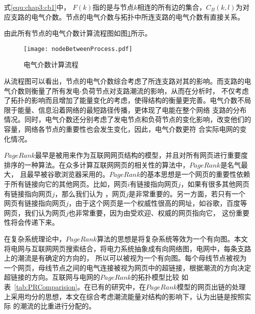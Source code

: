 式\ref{equ:chap3:cb1}中，
$F(k)$指的是与节点$k$相连的所有边的集合，$C_B (k,l)$为对应支路的电气介数。节点的电气介数与拓扑中所连支路的电气介数有直接关系。

由此所有节点的电气介数计算流程图如图\ref{fig:nodeBetweenPro}所示。 
\begin{figure}[H] 
  \centering
  \texttt{[image: nodeBetweenProcess.pdf]}
  \caption{电气介数计算流程}
  \label{fig:nodeBetweenPro}
\end{figure}

从流程图可以看出，节点的电气介数综合考虑了所连支路对其的影响。而支路的电气介数则衡量了所有发电-负荷节点对支路潮流的影响，从而在分析时，
不仅考虑了拓扑的影响而且增加了能量变化的考虑，使得结构的衡量更完善。电气介数不局限于能量、信息沿着网络的最短路径传播，更体现了电能在整个网络
支路的分布情况。同时，电气介数还分别考虑了发电节点和负荷节点的变化影响，改变他们的容量，网络各节点的重要性也会发生变化，因此，电气介数更符
合实际电网的变化情况。




$PageRank$最早是被用来作为互联网网页结构的模型，并且对所有网页进行重要度排序的一种算法\cite{refs68,refs69}。在众多计算互联网网页的相关性的算法中，$PageRank$是名气最大，
且最早被谷歌浏览器采用的。$PageRank$的基本思想是一个网页的重要性依赖于所有链接向它的其他网页。比如，网页$i$有链接指向网页$j$，如果有很多其他网页有链接指向网页$j$，那么我们认为
，网页$j$是非常重要的。另一方面，若只有一个网页有链接指向网页$j$，由于这个网页是一个权威性很高的网址，如谷歌，百度等网页，我们认为网页$j$也非常重要，因为由受欢迎、权威的网页指向它，
这份重要性将会传递下来。

在复杂系统理论中，$PageRank$算法的思想是将复杂系统等效为一个有向图。本文将电网与互联网网页搜索结合，将电力系统抽象成有向网络图，电网中，每条支路上的潮流是有确定的方向的，
所以可以被视为一个有向图。每个母线节点被视为一个网页，母线节点之间的电气连接被视为网页中的超链接，根据潮流的方向决定超链接的方向。互联网与电网的$PageRank$的拓扑模型比较
如表~\ref{tab:PRComparision}。在已有的研究中，在$PageRank$模型的网页出链的处理上采用均分的思想\cite{refs70}，本文在综合考虑潮流能量对结构的影响下，认为出链是按照实际
的潮流的比重进行分配的。

